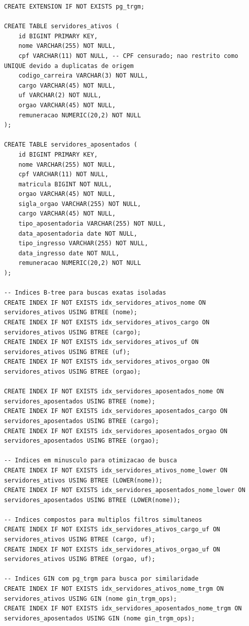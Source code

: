 \documentclass[12pt,a4paper]{article}
\begin{document}
\begin{lstlisting}
CREATE EXTENSION IF NOT EXISTS pg_trgm;

CREATE TABLE servidores_ativos (
    id BIGINT PRIMARY KEY,
    nome VARCHAR(255) NOT NULL,
    cpf VARCHAR(11) NOT NULL, -- CPF censurado; nao restrito como UNIQUE devido a duplicatas de origem
    codigo_carreira VARCHAR(3) NOT NULL,
    cargo VARCHAR(45) NOT NULL,
    uf VARCHAR(2) NOT NULL,
    orgao VARCHAR(45) NOT NULL,
    remuneracao NUMERIC(20,2) NOT NULL
);

CREATE TABLE servidores_aposentados (
    id BIGINT PRIMARY KEY,
    nome VARCHAR(255) NOT NULL,
    cpf VARCHAR(11) NOT NULL,
    matricula BIGINT NOT NULL,
    orgao VARCHAR(45) NOT NULL,
    sigla_orgao VARCHAR(255) NOT NULL,
    cargo VARCHAR(45) NOT NULL,
    tipo_aposentadoria VARCHAR(255) NOT NULL,
    data_aposentadoria date NOT NULL,
    tipo_ingresso VARCHAR(255) NOT NULL,
    data_ingresso date NOT NULL,
    remuneracao NUMERIC(20,2) NOT NULL
);

-- Indices B-tree para buscas exatas isoladas
CREATE INDEX IF NOT EXISTS idx_servidores_ativos_nome ON servidores_ativos USING BTREE (nome);
CREATE INDEX IF NOT EXISTS idx_servidores_ativos_cargo ON servidores_ativos USING BTREE (cargo);
CREATE INDEX IF NOT EXISTS idx_servidores_ativos_uf ON servidores_ativos USING BTREE (uf);
CREATE INDEX IF NOT EXISTS idx_servidores_ativos_orgao ON servidores_ativos USING BTREE (orgao);

CREATE INDEX IF NOT EXISTS idx_servidores_aposentados_nome ON servidores_aposentados USING BTREE (nome);
CREATE INDEX IF NOT EXISTS idx_servidores_aposentados_cargo ON servidores_aposentados USING BTREE (cargo);
CREATE INDEX IF NOT EXISTS idx_servidores_aposentados_orgao ON servidores_aposentados USING BTREE (orgao);

-- Indices em minusculo para otimizacao de busca
CREATE INDEX IF NOT EXISTS idx_servidores_ativos_nome_lower ON servidores_ativos USING BTREE (LOWER(nome));
CREATE INDEX IF NOT EXISTS idx_servidores_aposentados_nome_lower ON servidores_aposentados USING BTREE (LOWER(nome));

-- Indices compostos para multiplos filtros simultaneos
CREATE INDEX IF NOT EXISTS idx_servidores_ativos_cargo_uf ON servidores_ativos USING BTREE (cargo, uf);
CREATE INDEX IF NOT EXISTS idx_servidores_ativos_orgao_uf ON servidores_ativos USING BTREE (orgao, uf);

-- Indices GIN com pg_trgm para busca por similaridade 
CREATE INDEX IF NOT EXISTS idx_servidores_ativos_nome_trgm ON servidores_ativos USING GIN (nome gin_trgm_ops);
CREATE INDEX IF NOT EXISTS idx_servidores_aposentados_nome_trgm ON servidores_aposentados USING GIN (nome gin_trgm_ops);
\end{lstlisting}
\end{document}
